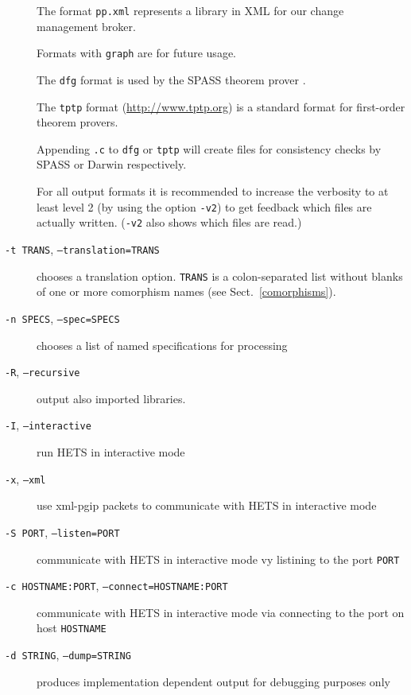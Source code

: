 \documentclass{article}
\newcommand{\normalTEXTSC}[2]{{#1\scriptsize#2}}
\newcommand     {\Hets}{\normalTEXTSC{H}{ETS}\xspace}
\newcommand     {\SPASS}{\normalTEXTSC{S}{PASS}\xspace}
\begin{document}
\begin{description}
The format \texttt{pp.xml} represents a library in XML for our change
  management broker.

Formats with \texttt{graph} are for future usage.

The \texttt{dfg} format is used by the \SPASS theorem prover
\cite{WeidenbachEtAl02}.

The \texttt{tptp} format (\url{http://www.tptp.org}) is a standard
format for first-order theorem provers.

Appending \texttt{.c} to \texttt{dfg} or \texttt{tptp} will create files for
consistency checks by SPASS or Darwin respectively.

For all output formats it is recommended to increase the verbosity to at least
level 2 (by using the option \texttt{-v2}) to get feedback which files are
actually written. (\texttt{-v2} also shows which files are read.)

\item[\texttt{-t TRANS}, \texttt{--translation=TRANS}]
chooses a translation option. \texttt{TRANS} is a colon-separated list
without blanks of one or more comorphism names (see Sect.~\ref{comorphisms}).

\item[\texttt{-n SPECS}, \texttt{--spec=SPECS}]
chooses a list of named specifications for processing

\item[\texttt{-R}, \texttt{--recursive}] output also imported libraries.

\item[\texttt{-I}, \texttt{--interactive}] run \Hets in interactive mode

\item[\texttt{-x}, \texttt{--xml}] use xml-pgip packets to communicate with
  \Hets in interactive mode

\item[\texttt{-S PORT}, \texttt{--listen=PORT}] communicate
  with \Hets in interactive mode vy listining to the port \texttt{PORT}

\item[\texttt{-c HOSTNAME:PORT}, \texttt{--connect=HOSTNAME:PORT}] communicate
  with \Hets in interactive mode via connecting to the port on host
  \texttt{HOSTNAME}

\item[\texttt{-d STRING}, \texttt{--dump=STRING}] produces implementation
  dependent output for debugging purposes only
\end{description}
\end{document}
